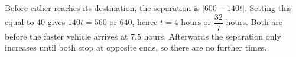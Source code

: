 Before either reaches its destination, the separation is $|600-140t|$. Setting this equal to $40$ gives $140t=560$ or $640$, hence $\boxed{t=4\text{ hours or }\dfrac{32}{7}\text{ hours}}$. Both are before the faster vehicle arrives at $7.5$ hours. Afterwards the separation only increases until both stop at opposite ends, so there are no further times.

